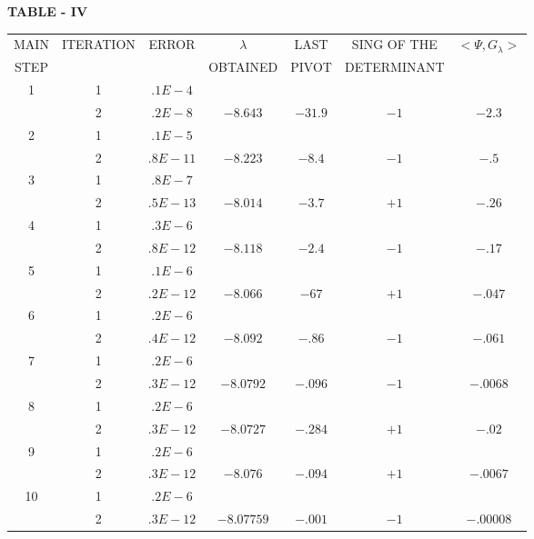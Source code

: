 \vfill\eject

{\fontsize{9}{11}\selectfont
\begin{center}
{\bf TABLE - IV}\pageoriginale

\medskip
\renewcommand{\arraystretch}{1.7}
\tabcolsep=2pt
\begin{tabular}{ccccccc}
\hline
MAIN & ITERATION & ERROR & $\lambda$ &  LAST &  SING OF THE & $< \Psi,
G_\lambda >$ \\ 
STEP  & & & OBTAINED & PIVOT & DETERMINANT \\
\hline
1 & 1 & .$1E-4$ \\
& 2 & .$2E-8$ & $-8.643$ & $-31.9$ & $-1$ & $-2.3$\\[4pt]
2 & 1 & .$1E-5$ \\
& 2 & .$8E-11$ & $-8.223$ & $-8.4$ & $-1$ & $-.5$\\[4pt]
3 & 1 & .$8E-7$ \\
& 2 & .$5E-13$ & $-8.014$ & $-3.7$ & $+1$ & $-.26$\\[4pt]
4 & 1 & .$3E-6$ \\
& 2 & .$8E-12$ & $-8.118$ & $-2.4$ & $-1$ & $-.17$\\[4pt]
5 & 1 & .$1E-6$ \\
& 2 & .$2E-12$ & $-8.066$ & $-67$ & $+1$ & $-.047$\\[4pt]
6 & 1 & .$2E-6$ \\
& 2 & .$4E-12$ & $-8.092$ & $-.86$ & $-1$ & $-.061$\\[4pt]
7 & 1 & .$2E-6$ \\
& 2 & .$3E-12$ & $-8.0792$ & $-.096$ & $-1$ & $-.0068$\\[4pt]
8 & 1 & .$2E-6$ \\
& 2 & .$3E-12$ & $-8.0727$ & $-.284$ & $+1$ & $-.02$\\[4pt]
9 & 1 & .$2E-6$ \\
& 2 & .$3E-12$ & $-8.076$ & $-.094$ & $+1$ & $-.0067$\\[4pt]
10 & 1 & .$2E-6$ \\
& 2 & .$3E-12$ & $-8.07759$ & $-.001$ & $-1$ & $-.00008$\\
\hline
\end{tabular} 
\end{center}}\relax

\vfill\eject


